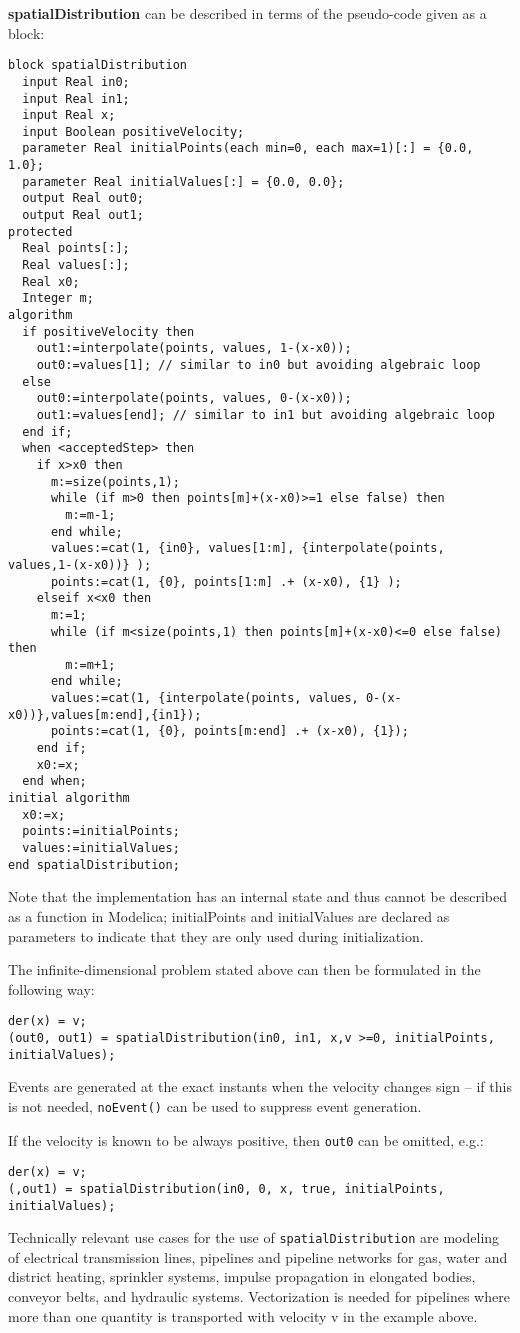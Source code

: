 \textbf{spatialDistribution} can be described in terms of the pseudo-code given as a block:
\begin{lstlisting}[language=modelica]
block spatialDistribution
  input Real in0;
  input Real in1;
  input Real x;
  input Boolean positiveVelocity;
  parameter Real initialPoints(each min=0, each max=1)[:] = {0.0, 1.0};
  parameter Real initialValues[:] = {0.0, 0.0};
  output Real out0;
  output Real out1;
protected
  Real points[:];
  Real values[:];
  Real x0;
  Integer m;
algorithm
  if positiveVelocity then
    out1:=interpolate(points, values, 1-(x-x0));
    out0:=values[1]; // similar to in0 but avoiding algebraic loop
  else
    out0:=interpolate(points, values, 0-(x-x0));
    out1:=values[end]; // similar to in1 but avoiding algebraic loop
  end if;
  when <acceptedStep> then
    if x>x0 then
      m:=size(points,1);
      while (if m>0 then points[m]+(x-x0)>=1 else false) then
        m:=m-1;
      end while;
      values:=cat(1, {in0}, values[1:m], {interpolate(points, values,1-(x-x0))} );
      points:=cat(1, {0}, points[1:m] .+ (x-x0), {1} );
    elseif x<x0 then
      m:=1;
      while (if m<size(points,1) then points[m]+(x-x0)<=0 else false) then
        m:=m+1;
      end while;
      values:=cat(1, {interpolate(points, values, 0-(x-x0))},values[m:end],{in1});
      points:=cat(1, {0}, points[m:end] .+ (x-x0), {1});
    end if;
    x0:=x;
  end when;
initial algorithm
  x0:=x;
  points:=initialPoints;
  values:=initialValues;
end spatialDistribution;
\end{lstlisting}

\begin{nonnormative}
Note that the implementation has an internal state and thus
cannot be described as a function in Modelica; initialPoints and
initialValues are declared as parameters to indicate that they are only
used during initialization.

The infinite-dimensional problem stated above can then be formulated in the following way:
\begin{lstlisting}[language=modelica]
der(x) = v;
(out0, out1) = spatialDistribution(in0, in1, x,v >=0, initialPoints, initialValues);
\end{lstlisting}

Events are generated at the exact instants when the velocity
changes sign -- if this is not needed, \lstinline!noEvent()! can be used to
suppress event generation.

If the velocity is known to be always positive, then \lstinline!out0! can be omitted, e.g.:
\begin{lstlisting}[language=modelica]
der(x) = v;
(,out1) = spatialDistribution(in0, 0, x, true, initialPoints, initialValues);
\end{lstlisting}
Technically relevant use cases for the use of
\lstinline!spatialDistribution! are modeling of electrical
transmission lines, pipelines and pipeline networks for gas, water and
district heating, sprinkler systems, impulse propagation in elongated
bodies, conveyor belts, and hydraulic systems. Vectorization is needed
for pipelines where more than one quantity is transported with velocity
v in the example above.
\end{nonnormative}

